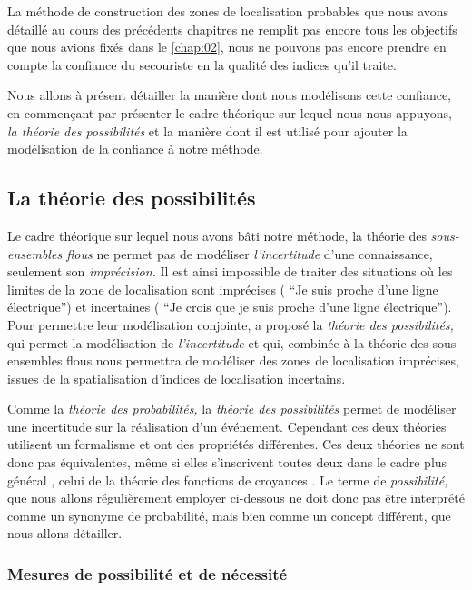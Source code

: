 La méthode de construction des zones de localisation probables que
nous avons détaillé au cours des précédents chapitres ne remplit pas
encore tous les objectifs que nous avions fixés dans le
\autoref{chap:02}, nous ne pouvons pas encore prendre en compte la
confiance du secouriste en la qualité des indices qu'il traite.

Nous allons à présent détailler la manière dont nous modélisons cette
confiance, en commençant par présenter le cadre théorique sur lequel
nous nous appuyons, \emph{la théorie des possibilités} et la manière
dont il est utilisé pour ajouter la modélisation de la confiance à
notre méthode.

\subsection{La théorie des possibilités}

Le cadre théorique sur lequel nous avons bâti notre méthode, la
théorie des \emph{sous-ensembles flous} ne permet pas de modéliser
\emph{l'incertitude} d'une connaissance, seulement son
\emph{imprécision.} Il est ainsi impossible de traiter des situations
où les limites de la zone de localisation sont imprécises (\eg
\enquote{Je suis proche d'une ligne électrique}) et incertaines (\eg
\enquote{Je crois que je suis proche d'une ligne électrique}). Pour
permettre leur modélisation conjointe, \textcite{Zadeh1978} a proposé
la \emph{théorie des possibilités,} qui permet la modélisation de
\emph{l'incertitude} et qui, combinée à la théorie des sous-ensembles
flous nous permettra de modéliser des zones de localisation
imprécises, issues de la spatialisation d'indices de localisation
incertains.

Comme la \emph{théorie des probabilités,} la \emph{théorie des
  possibilités} permet de modéliser une incertitude sur la réalisation
d'un événement. Cependant ces deux théories utilisent un formalisme et
ont des propriétés différentes. Ces deux théories ne sont donc pas
équivalentes, même si elles s’inscrivent toutes deux dans le cadre
plus général \autocite{Bouchon-Meunier1995}, celui de la théorie des
fonctions de croyances \autocite{Shafer1976}. Le terme de
\emph{possibilité,} que nous allons régulièrement employer ci-dessous
ne doit donc pas être interprété comme un synonyme de probabilité,
mais bien comme un concept différent, que nous allons détailler.

\subsubsection{Mesures de possibilité et de nécessité}

